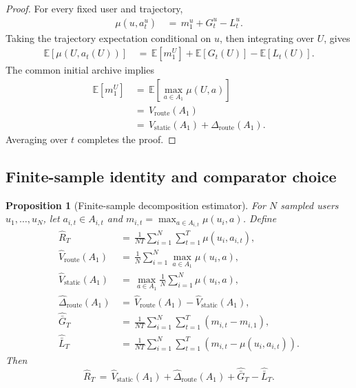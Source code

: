 \documentclass{article} %
\newtheorem{proposition}[theorem]{Proposition}
\begin{document}
\begin{proof}
For every fixed user and trajectory,
\begin{equation}
\begin{aligned}
\mu(u,a_t^u)
&\,=\,
m_1^u
+
G_t^u
-
L_t^u.
\end{aligned}
\end{equation}
Taking the trajectory expectation conditional on \(u\), then integrating over
\(U\), gives
\begin{equation}
\begin{aligned}
\mathbb{E}[\mu(U,a_t(U))]
&\,=\,
\mathbb{E}[m_1^U]
+
\mathbb{E}[G_t(U)]
-
\mathbb{E}[L_t(U)].
\end{aligned}
\end{equation}
The common initial archive implies
\begin{equation}
\begin{aligned}
\mathbb{E}[m_1^U]
&\,=\,
\mathbb{E}\!\left[
\max_{a\in A_1}
\mu(U,a)
\right]
\\
&\,=\,
V_{\mathrm{route}}(A_1)
\\
&\,=\,
V_{\mathrm{static}}(A_1)
+
\Delta_{\mathrm{route}}(A_1).
\end{aligned}
\end{equation}
Averaging over \(t\) completes the proof.
\end{proof}

\subsection{Finite-sample identity and comparator choice}

\begin{proposition}[Finite-sample decomposition estimator]
\label{prop:6}
For \(N\) sampled users \(u_1,\ldots,u_N\), let
\(a_{i,t}\in A_{i,t}\) and
\(m_{i,t}=\max_{a\in A_{i,t}}\mu(u_i,a)\).  Define
\begin{equation}
\begin{aligned}
\widehat R_T
&\,=\,
\frac{1}{NT}
\sum_{i=1}^{N}
\sum_{t=1}^{T}
\mu(u_i,a_{i,t}), \\
\widehat V_{\mathrm{route}}(A_1)
&\,=\,
\frac{1}{N}
\sum_{i=1}^{N}
\max_{a\in A_1}
\mu(u_i,a), \\
\widehat V_{\mathrm{static}}(A_1)
&\,=\,
\max_{a\in A_1}
\frac{1}{N}
\sum_{i=1}^{N}
\mu(u_i,a), \\
\widehat\Delta_{\mathrm{route}}(A_1)
&\,=\,
\widehat V_{\mathrm{route}}(A_1)
-
\widehat V_{\mathrm{static}}(A_1), \\
\widehat{\bar G}_T
&\,=\,
\frac{1}{NT}
\sum_{i=1}^{N}
\sum_{t=1}^{T}
(m_{i,t}-m_{i,1}), \\
\widehat{\bar L}_T
&\,=\,
\frac{1}{NT}
\sum_{i=1}^{N}
\sum_{t=1}^{T}
(m_{i,t}-\mu(u_i,a_{i,t})).
\end{aligned}
\end{equation}
Then
\begin{equation}
\widehat R_T
\,=\,
\widehat V_{\mathrm{static}}(A_1)
+
\widehat\Delta_{\mathrm{route}}(A_1)
+
\widehat{\bar G}_T
-
\widehat{\bar L}_T.
\end{equation}
\end{proposition}
\end{document}
